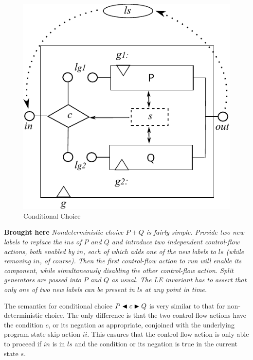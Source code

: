 \begin{figure}[h]
  \centering
  \includegraphics{images/conditional-actual}
  \caption{Conditional Choice}
  \label{fig:conditional}
\end{figure}


\textbf{Brought here}
\emph{Nondeterministic choice $P+Q$ is fairly simple.
Provide two new labels to replace the $in$s of $P$ and $Q$
and introduce two independent control-flow actions,
both enabled by $in$, each of which adds one of the new labels to $ls$
(while removing $in$, of course).
Then the first control-flow action to run will enable its component,
while simultaneously disabling the other control-flow action.
Split generators are passed into $P$ and $Q$ as usual.
The LE invariant has to assert that only one of two new labels
can be present in $ls$ at any point in time.
}

The semantics for conditional choice $P \mathrel{\blacktriangleleft{c}\blacktriangleright} Q$
is very similar to that for non-deterministic choice.
The only difference is that the two control-flow actions
have the condition $c$, or its negation as appropriate,
conjoined with the underlying program state skip action $ii$.
This ensures that the control-flow action is only able to proceed
if $in$ is in $ls$ and the condition or its negation is true
in the current state $s$.


